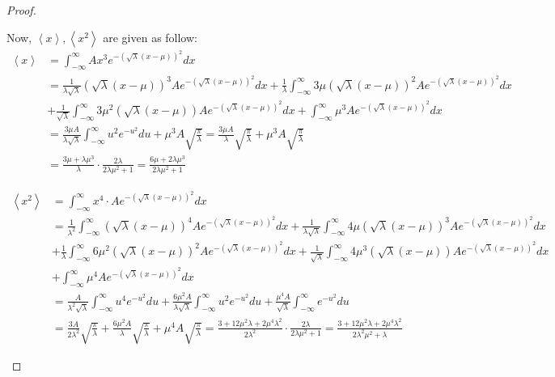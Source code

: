 \documentclass{article}
\begin{document}
\begin{proof}
\begin{itemize}
        \hfil

        Now, $\left<x\right>,\left<x^2\right>$ are given as follow:
        \begin{align}
            \left<x\right>&=\int_{-\infty}^{\infty}Ax^3e^{-(\sqrt{\lambda}(x-\mu))^2}dx\\
            &= \frac{1}{\lambda\sqrt{\lambda}}(\sqrt{\lambda}(x-\mu))^3 Ae^{-(\sqrt{\lambda}(x-\mu))^2}dx + \frac{1}{\lambda}\int_{-\infty}^{\infty}3\mu(\sqrt{\lambda}(x-\mu))^2 Ae^{-(\sqrt{\lambda}(x-\mu))^2}dx\\
            &+ \frac{1}{\sqrt{\lambda}}\int_{-\infty}^{\infty}3\mu^2(\sqrt{\lambda}(x-\mu))Ae^{-(\sqrt{\lambda}(x-\mu))^2}dx + \int_{-\infty}^{\infty}\mu^3 Ae^{-(\sqrt{\lambda}(x-\mu))^2}dx\\
            &= \frac{3\mu A}{\lambda\sqrt{\lambda}}\int_{-\infty}^{\infty}u^2e^{-u^2}du + \mu^3 A\sqrt{\frac{\pi}{\lambda}} = \frac{3\mu A}{\lambda}\sqrt{\frac{\pi}{\lambda}}+\mu^3 A\sqrt{\frac{\pi}{\lambda}}\\
            &= \frac{3\mu+\lambda\mu^3}{\lambda}\cdot \frac{2\lambda}{2\lambda\mu^2+1} = \frac{6\mu+2\lambda\mu^3}{2\lambda\mu^2+1}
        \end{align}

        \hfil

        \begin{align}
            \left<x^2\right>&=\int_{-\infty}^{\infty}x^4\cdot Ae^{-(\sqrt{\lambda}(x-\mu))^2}dx\\
            &= \frac{1}{\lambda^2}\int_{-\infty}^{\infty}(\sqrt{\lambda}(x-\mu))^4 Ae^{-(\sqrt{\lambda}(x-\mu))^2}dx+\frac{1}{\lambda\sqrt{\lambda}}\int_{-\infty}^{\infty}4\mu(\sqrt{\lambda}(x-\mu))^3 Ae^{-(\sqrt{\lambda}(x-\mu))^2}dx\\
            &+ \frac{1}{\lambda}\int_{-\infty}^{\infty}6\mu^2(\sqrt{\lambda}(x-\mu))^2 Ae^{-(\sqrt{\lambda}(x-\mu))^2}dx+\frac{1}{\sqrt{\lambda}}\int_{-\infty}^{\infty}4\mu^3(\sqrt{\lambda}(x-\mu))Ae^{-(\sqrt{\lambda}(x-\mu))^2}dx\\
            &+ \int_{-\infty}^{\infty}\mu^4Ae^{-(\sqrt{\lambda}(x-\mu))^2}dx\\
            &= \frac{A}{\lambda^2\sqrt{\lambda}}\int_{-\infty}^{\infty}u^4e^{-u^2}du+\frac{6\mu^2A}{\lambda\sqrt{\lambda}}\int_{-\infty}^{\infty}u^2e^{-u^2}du + \frac{\mu^4A}{\sqrt{\lambda}}\int_{-\infty}^{\infty}e^{-u^2}du\\
            &= \frac{3A}{2\lambda^2}\sqrt{\frac{\pi}{\lambda}} + \frac{6\mu^2A}{\lambda}\sqrt{\frac{\pi}{\lambda}}+\mu^4A\sqrt{\frac{\pi}{\lambda}} = \frac{3+12\mu^2\lambda+2\mu^4\lambda^2}{2\lambda^2}\cdot \frac{2\lambda}{2\lambda\mu^2+1}=\frac{3+12\mu^2\lambda+2\mu^4\lambda^2}{2\lambda^2\mu^2+\lambda}
        \end{align}


\end{itemize}
\end{proof}
\end{document}

